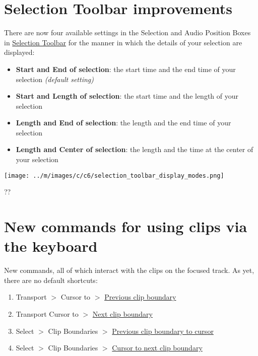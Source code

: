 \documentclass[]{book}
\begin{document}
\begin{multicols}{2}
\section{Selection Toolbar improvements}


There are now four available settings in the Selection and Audio Position Boxes in 
\hyperref[selection_toolbar_]{Selection Toolbar}
 for the  manner in which the details of your selection are displayed:
\begin{itemize}
\item \textbf{Start and End of selection}: the start time and the end time of your selection \textit{(default setting)}
\item \textbf{Start and Length of selection}: the start time and the length of your selection
\item \textbf{Length and End of selection}: the length and the end time of your selection
\item \textbf{Length and Center of selection}: the length and the time at the center of your selection
\end{itemize}
\par\texttt{[image: ../m/images/c/c6/selection\_toolbar\_display\_modes.png]}\par??


\section{New commands for using clips via the keyboard}


New commands, all of which interact with the clips on the focused track. As yet, there are no default shortcuts:
\begin{enumerate}
\item Transport \mbox{$>$} Cursor to \mbox{$>$} 
\hyperref[transport_menu_cursor_to__previous_clip_boundary]{Previous clip boundary}

\item Transport Cursor to \mbox{$>$} 
\hyperref[transport_menu_cursor_to__next_clip_boundary]{Next clip boundary}

\item Select \mbox{$>$} Clip Boundaries \mbox{$>$} 
\hyperref[select_menu_clip_boundaries__previous_clip_boundary_to_cursor]{Previous clip boundary to cursor}
 
\item Select \mbox{$>$} Clip Boundaries \mbox{$>$} 
\hyperref[select_menu_clip_boundaries__cursor_to_next_clip_boundary]{Cursor to next clip boundary}
 

\end{enumerate}
\end{multicols}
\end{document}
